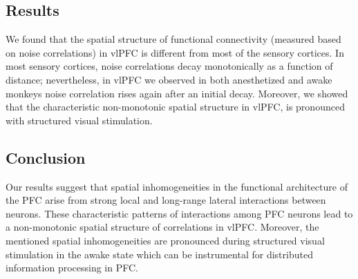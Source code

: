 \subsection*{Results}

We found that the spatial structure of functional connectivity
(measured based on noise correlations) in vlPFC is different from most of the sensory cortices.
In most sensory cortices, noise correlations decay monotonically as a function of distance;
nevertheless, in vlPFC we observed in both anesthetized and
awake monkeys noise correlation rises again after an initial decay.
Moreover, we showed that the characteristic non-monotonic spatial
structure in vlPFC,
is pronounced with structured visual stimulation.


\subsection*{Conclusion}

Our results suggest that spatial inhomogeneities in the functional
architecture of the PFC arise from strong local and long-range lateral
interactions between neurons.
These characteristic patterns of interactions among PFC neurons lead
to a non-monotonic spatial structure of correlations in vlPFC.
Moreover, the mentioned spatial inhomogeneities are pronounced during structured
visual stimulation in the awake state which can be instrumental for
distributed information processing in PFC.



